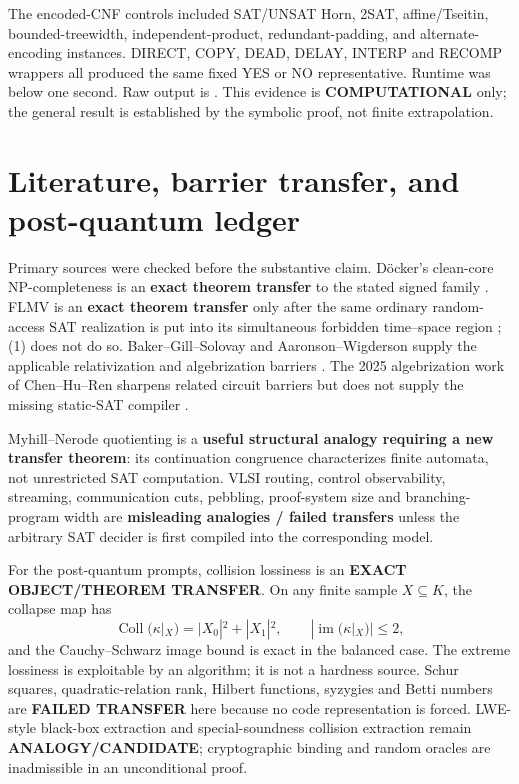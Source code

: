 \documentclass[11pt]{article}
\newcommand{\COMP}{\textbf{COMPUTATIONAL}}
\begin{document}
The encoded-CNF controls included SAT/UNSAT Horn, 2SAT, affine/Tseitin,
bounded-treewidth, independent-product, redundant-padding, and alternate-
encoding instances.  DIRECT, COPY, DEAD, DELAY, INTERP and RECOMP wrappers
all produced the same fixed YES or NO representative.  Runtime was below one
second.  Raw output is
.
This evidence is \COMP{} only; the general result is established by the
symbolic proof, not finite extrapolation.

\section{Literature, barrier transfer, and post-quantum ledger}

Primary sources were checked before the substantive claim.  D\"ocker's
clean-core NP-completeness is an \textbf{exact theorem transfer} to the stated
signed family \cite{Docker20}.  FLMV is an \textbf{exact theorem transfer}
only after the same ordinary random-access SAT realization is put into its
simultaneous forbidden time--space region \cite{FLMV05}; (1) does not do so.
Baker--Gill--Solovay and Aaronson--Wigderson supply the applicable
relativization and algebrization barriers \cite{BGS75,AW09}.  The 2025
algebrization work of Chen--Hu--Ren sharpens related circuit barriers but does
not supply the missing static-SAT compiler \cite{CHR25}.

Myhill--Nerode quotienting is a \textbf{useful structural analogy requiring a
new transfer theorem}: its continuation congruence characterizes finite
automata, not unrestricted SAT computation.  VLSI routing, control
observability, streaming, communication cuts, pebbling, proof-system size and
branching-program width are \textbf{misleading analogies / failed transfers}
unless the arbitrary SAT decider is first compiled into the corresponding
model.

For the post-quantum prompts, collision lossiness is an \textbf{EXACT
OBJECT/THEOREM TRANSFER}.  On any finite sample $X\subseteq K$, the collapse
map has
\[
 \operatorname{Coll}(\kappa|_X)=|X_0|^2+|X_1|^2,
 \qquad |\operatorname{im}(\kappa|_X)|\le2,
\]
and the Cauchy--Schwarz image bound is exact in the balanced case.  The
extreme lossiness is exploitable by an algorithm; it is not a hardness source.
Schur squares, quadratic-relation rank, Hilbert functions, syzygies and Betti
numbers are \textbf{FAILED TRANSFER} here because no code representation is
forced.  LWE-style black-box extraction and special-soundness collision
extraction remain \textbf{ANALOGY/CANDIDATE}; cryptographic binding and random
oracles are inadmissible in an unconditional proof.
\end{document}
